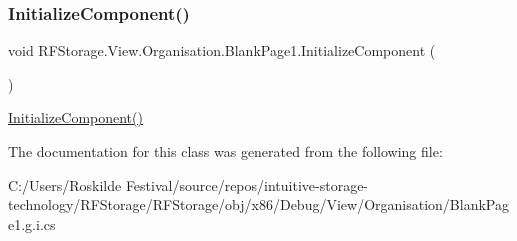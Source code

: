 \subsubsection{\texorpdfstring{InitializeComponent()}{InitializeComponent()}}
{\footnotesize\ttfamily void R\+F\+Storage.\+View.\+Organisation.\+Blank\+Page1.\+Initialize\+Component (\begin{DoxyParamCaption}{ }\end{DoxyParamCaption})}



\mbox{\hyperlink{class_r_f_storage_1_1_view_1_1_organisation_1_1_blank_page1_a5d36a6a7db0934fa3d5009d94a170dfd}{Initialize\+Component()}} 



The documentation for this class was generated from the following file\+:\begin{DoxyCompactItemize}
\item 
C\+:/\+Users/\+Roskilde Festival/source/repos/intuitive-\/storage-\/technology/\+R\+F\+Storage/\+R\+F\+Storage/obj/x86/\+Debug/\+View/\+Organisation/Blank\+Page1.\+g.\+i.\+cs\end{DoxyCompactItemize}
